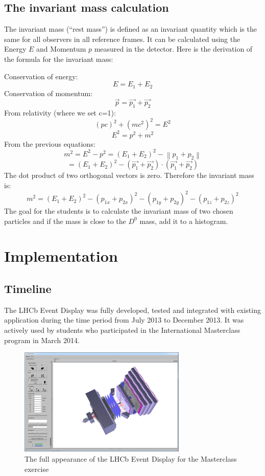 \documentclass[3p,times,twocolumn]{elsarticle}
\begin{document}
\subsection{The invariant mass calculation}
The invariant mass (``rest mass'') is defined as an invariant quantity which is the same for all observers in all reference frames. It can be calculated using the Energy $E$ and Momentum $p$ measured in the detector. Here is the derivation of the formula for the invariant mass: \par
Conservation of energy: $$E=E_{1}+E_{2}$$
Conservation of momentum: $$\overrightarrow{p}=\overrightarrow{p_{1}}+\overrightarrow{p_{2}}$$
From relativity (where we set c=1): $$\left ( pc \right )^{2}+\left ( mc^{2} \right )^{2}=E^{2}$$
$$E^{2}=p^{2}+m^{2}$$
From the previous equations: $$m^{2}=E^{2}-p^{2}=\left ( E_{1}+E_{2} \right )^{2}-\left \| p_{1}+p_{2} \right \|$$ 
$$=\left ( E_{1}+E_{2} \right )^{2}-\left (\overrightarrow{p_{1}}+\overrightarrow{p_{2}}  \right )\cdot \left ( \overrightarrow{p_{1}}+\overrightarrow{p_{2}} \right )$$
The dot product of two orthogonal vectors is zero. Therefore the invariant mass is:
$$m^{2}=\left ( E_{1}+E_{2} \right )^{2}-\left ( p_{1x}+p_{2x} \right )^{2}-\left ( p_{1y}+p_{2y} \right )^{2}-\left ( p_{1z}+p_{2z} \right )^{2}$$
The goal for the students is to calculate the invariant mass of two chosen particles and if the mass is close to the $D^{0}$ mass, add it to a histogram.
\section{Implementation}
\subsection{Timeline}
The LHCb Event Display was fully developed, tested and integrated with existing application during the time period from July 2013 to December 2013. It was actively used by students who participated in the International Masterclass program in March 2014.
\begin{figure}[ht!]
	\centering
	\includegraphics[width=80mm]{2rr2gid.png}
	\caption{The full appearance of the LHCb Event Display for the Masterclass exercise \label{o5}}
\end{figure}
\end{document}

